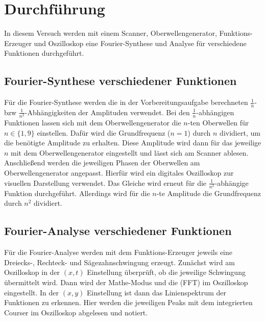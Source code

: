 \section{Durchführung}
\label{sec:Durchführung}
In diesem Versuch werden mit einem Scanner, Oberwellengenerator, Funktions-Erzeuger und Oszilloskop eine 
Fourier-Synthese und Analyse für verschiedene Funktionen durchgeführt.
\subsection{Fourier-Synthese verschiedener Funktionen}
Für die Fourier-Synthese werden die in der Vorbereitungsaufgabe berechneten 
$\frac{1}{n}$- bzw $\frac{1}{n^2}$-Abhängigkeiten der Amplituden verwendet. 
Bei den $\frac{1}{n}$-abhängigen Funktionen lassen sich mit dem Oberwellengenerator
die $n$-ten Oberwellen für $n \in \{1,9\}$ einstellen. Dafür wird die Grundfrequenz 
($n=1$) durch $n$ dividiert, um die benötigte Amplitude zu erhalten. Diese Amplitude 
wird dann für das jeweilige $n$ mit dem Oberwellengenerator eingestellt und lässt sich am
Scanner ablesen.
Anschließend werden die jeweiligen Phasen der Oberwellen am Oberwellengenerator angepasst. 
Hierfür wird ein digitales Oszilloskop zur visuellen Darstellung verwendet. 
Das Gleiche wird erneut für die $\frac{1}{n^2}$-abhängige Funktion durchgeführt. Allerdings
wird für die $n$-te Amplitude die Grundfrequenz durch $n^2$ dividiert. 
\subsection{Fourier-Analyse verschiedener Funktionen}
Für die Fourier-Analyse werden mit dem Funktions-Erzeuger jeweils eine Dreiecks-, Rechteck- und 
Sägezahnschwingung erzeugt. Zunächst wird am Oszilloskop in der $(x,t)$ Einstellung überprüft,
ob die jeweilige Schwingung übermittelt wird. Dann wird der Mathe-Modus und die \grqq{}(FFT)
im Oszilloskop eingestellt. In der $(x,y)$ Einstellung ist dann das Linienspektrum der Funktionen zu erkennen. Hier werden die jeweiligen Peaks mit
dem integrierten Courser im Oszilloskop abgelesen und notiert.